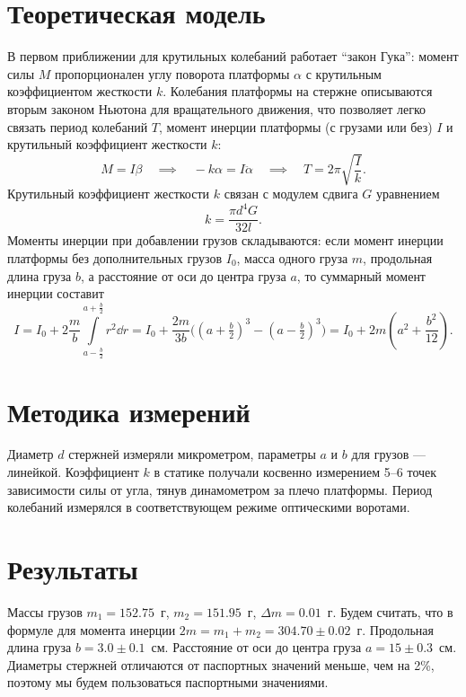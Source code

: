 \documentclass[a4paper, 12pt]{article}
\begin{document}
\section{Теоретическая модель}
В первом приближении для крутильных колебаний работает ``закон Гука'': момент силы $M$ пропорционален углу поворота платформы $\alpha$ с крутильным коэффициентом жесткости $k$.
Колебания платформы на стержне описываются вторым законом Ньютона для вращательного движения, что позволяет легко связать период колебаний $T$, момент инерции платформы (с грузами или без) $I$ и крутильный коэффициент жесткости $k$:
\[ M = I \beta \quad\implies\quad -k\alpha = I \ddot{\alpha} \quad\implies\quad T = 2 \pi \sqrt{\frac{I}{k}} .\]
Крутильный коэффициент жесткости $k$ связан с модулем сдвига $G$ уравнением
\[ k = \frac{\pi d^4 G}{32l} \tag{$d$ --- диаметр, $l$ --- длина стержня} .\]
Моменты инерции при добавлении грузов складываются: если момент инерции платформы без дополнительных грузов $I_0$, масса одного груза $m$, продольная длина груза $b$, а расстояние от оси до центра груза $a$, то суммарный момент инерции составит
\[
I = I_0 + 2 \frac{m}{b} \int\limits_{a - \frac{b}{2}}^{a + \frac{b}{2}} r^2 \dd r =
    I_0 + \frac{2m}{3b} \bigl( (a + \tfrac{b}{2})^3 - (a - \tfrac{b}{2})^3 \bigr) =
    I_0 + 2m \left( a^2 + \frac{b^2}{12} \right)
.\]

\section{Методика измерений}
Диаметр $d$ стержней измеряли микрометром, параметры $a$ и $b$ для грузов --- линейкой.
Коэффициент $k$ в статике получали косвенно измерением 5--6 точек зависимости силы от угла, тянув динамометром за плечо платформы.
Период колебаний измерялся в соответствующем режиме оптическими воротами.

\section{Результаты}
Массы грузов $m_1 = 152.75$~г, $m_2 = 151.95$~г, $\Delta m = 0.01$~г.
Будем считать, что в формуле для момента инерции $2m = m_1 + m_2 = 304.70 \pm 0.02$~г.
Продольная длина груза $b = 3.0 \pm 0.1$~см.
Расстояние от оси до центра груза $a = 15 \pm 0.3$~см.
Диаметры стержней отличаются от паспортных значений меньше, чем на 2\%, поэтому мы будем пользоваться паспортными значениями.
\end{document}
